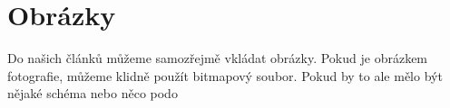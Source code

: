 \documentclass[11pt, a4paper]{article}
\begin{document}
\section{Obrázky}
Do našich článků můžeme samozřejmě vkládat obrázky. Pokud je obrázkem fotografie, můžeme klidně použít bitmapový soubor. Pokud by to ale mělo být nějaké schéma nebo něco podo
\end{document}
